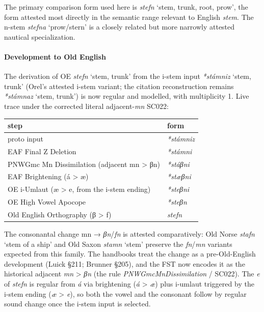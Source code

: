 \documentclass[
  british,
  a4paper,
]{article}
\newcounter{none} %
\providecommand{\Recon}[1]{\emph{*#1}}
\begin{document}
The primary comparison form used here is {\emph{stefn}} `stem, trunk,
root, prow', the form attested most directly in the semantic range
relevant to English \emph{stem}. The n-stem {\emph{stefna}} `prow/stern'
is a closely related but more narrowly attested nautical specialization.

\paragraph{Development to Old
English}\label{development-to-old-english-114}

The derivation of OE {\emph{stefn}} `stem, trunk' from the i-stem input
\Recon{stámniz} `stem, trunk' (Orel's attested i-stem variant; the
citation reconstruction remains \Recon{stámnaz} `stem, trunk') is now
regular and modelled, with multiplicity 1. Live trace under the
corrected literal adjacent-\emph{mn} SC022:

{\def\LTcaptype{none} %
\begin{longtable}[]{@{}ll@{}}
\toprule\noalign{}
step & form \\
\midrule\noalign{}
\endhead
\bottomrule\noalign{}
\endlastfoot
proto input & \emph{*stámniz} \\
EAF Final Z Deletion & \emph{*stámni} \\
PNWGmc Mn Dissimilation (adjacent mn \textgreater{} βn) &
\emph{*stáβni} \\
EAF Brightening (á \textgreater{} æ) & \emph{*stæβni} \\
OE i-Umlaut (æ \textgreater{} e, from the i-stem ending) &
\emph{*steβni} \\
OE High Vowel Apocope & \emph{*steβn} \\
Old English Orthography (β \textgreater{} f) & \emph{stefn} \\
\end{longtable}
}

The consonantal change mn → \emph{βn}/\emph{fn} is attested
comparatively: Old Norse {\emph{stafn}} `stem of a ship' and Old Saxon
{\emph{stamn}} `stem' preserve the \emph{fn}/\emph{mn} variants expected
from this family. The handbooks treat the change as a pre-Old-English
development (Luick §211; Brunner §205), and the FST now encodes it as
the historical adjacent \emph{mn} \textgreater{} \emph{βn} (the rule
\emph{PNWGmcMnDissimilation} / SC022). The \emph{e} of \emph{stefn} is
regular from \emph{á} via brightening (\emph{á} \textgreater{} \emph{æ})
plus i-umlaut triggered by the i-stem ending (\emph{æ} \textgreater{}
\emph{e}), so both the vowel and the consonant follow by regular sound
change once the i-stem input is selected.
\end{document}
